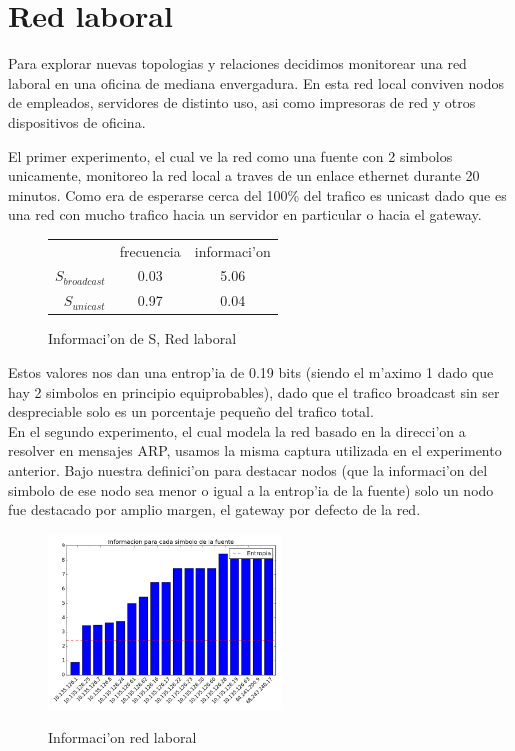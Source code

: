\section{Red laboral}
Para explorar nuevas topologias y relaciones decidimos monitorear una red laboral en una oficina de mediana envergadura. En esta
red local conviven nodos de empleados, servidores de distinto uso, asi como impresoras de red y otros dispositivos de oficina. 

El primer experimento, el cual ve la red como una fuente con 2 simbolos unicamente, monitoreo la red local a traves de un enlace
ethernet durante 20 minutos. Como era de esperarse cerca del 100\% del trafico es unicast dado que es una red con mucho trafico
hacia un servidor en particular o hacia el gateway.

\begin{figure}[!h]
\centering
\caption{Informaci'on de S, Red laboral}
\begin{tabular}{ r|c|c| }
\multicolumn{1}{r}{}
 &  \multicolumn{1}{c}{frecuencia}
 & \multicolumn{1}{c}{informaci'on} \\
\cline{2-3}
$S_{broadcast}$ & 0.03 & 5.06 \\
\cline{2-3}
$S_{unicast}$ & 0.97 & 0.04 \\
\cline{2-3}
\end{tabular}
\end{figure}
 
 Estos valores nos dan una entrop'ia de 0.19 bits (siendo el m'aximo 1 dado que hay 2 simbolos en principio equiprobables),
 dado que el trafico broadcast sin ser despreciable solo es un porcentaje peque\~no del trafico total.\\
 
En el segundo experimento, el cual modela la red basado en la direcci'on a resolver en mensajes ARP, usamos la misma captura
utilizada en el experimento anterior. Bajo nuestra definici'on para destacar nodos (que la informaci'on del simbolo de ese nodo 
sea menor o igual a la entrop'ia de la fuente) solo un nodo fue destacado por amplio margen, el gateway por defecto de la red.\\

\begin{figure}[!h]
\centering
\caption{Informaci'on red laboral}
\includegraphics[width=0.55\textwidth]{red2_info}
 \label{fig:red2info}
\end{figure}


